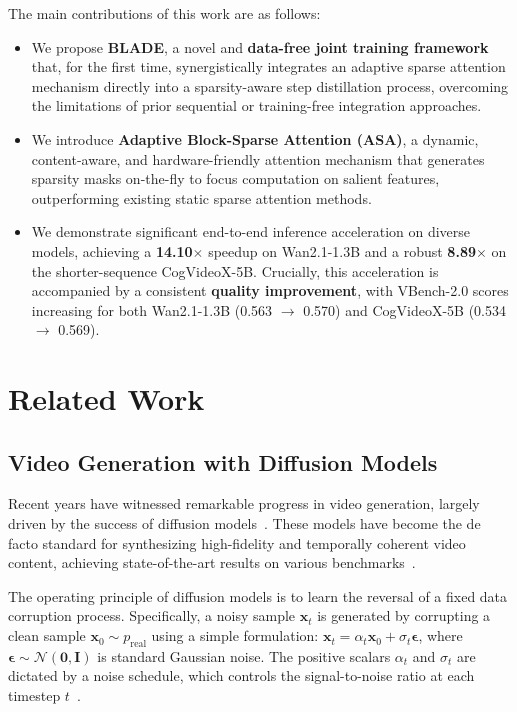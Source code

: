 \documentclass[letterpaper]{article} %
\begin{document}
The main contributions of this work are as follows:
\begin{itemize}
\item We propose \textbf{BLADE}, a novel and \textbf{data-free joint training framework} that, for the first time, synergistically integrates an adaptive sparse attention mechanism directly into a sparsity-aware step distillation process, overcoming the limitations of prior sequential or training-free integration approaches.
\item We introduce \textbf{Adaptive Block-Sparse Attention (ASA)}, a dynamic, content-aware, and hardware-friendly attention mechanism that generates sparsity masks on-the-fly to focus computation on salient features, outperforming existing static sparse attention methods.
\item We demonstrate significant end-to-end inference acceleration on diverse models, achieving a \textbf{14.10$\times$} speedup on Wan2.1-1.3B and a robust \textbf{8.89$\times$} on the shorter-sequence CogVideoX-5B. Crucially, this acceleration is accompanied by a consistent \textbf{quality improvement}, with VBench-2.0 scores increasing for both Wan2.1-1.3B (0.563 $\to$ 0.570) and CogVideoX-5B (0.534 $\to$ 0.569).
\end{itemize}

\section{Related Work}
\label{sec:related_work}

\subsection{Video Generation with Diffusion Models}
Recent years have witnessed remarkable progress in video generation, largely driven by the success of diffusion models~\cite{ho2020denoisingdiffusionprobabilisticmodels,song2021scorebasedgenerativemodelingstochastic,ma2025lattelatentdiffusiontransformer,cao2024controllablegenerationtexttoimagediffusion,he2023latentvideodiffusionmodels}. These models have become the de facto standard for synthesizing high-fidelity and temporally coherent video content, achieving state-of-the-art results on various benchmarks~\cite{huang2023vbench, zheng2025vbench2}.

The operating principle of diffusion models is to learn the reversal of a fixed data corruption process. Specifically, a noisy sample $\mathbf{x}_t$ is generated by corrupting a clean sample $\mathbf{x}_0 \sim p_{\text{real}}$ using a simple formulation: $\mathbf{x}_t = \alpha_t \mathbf{x}_0 + \sigma_t \boldsymbol{\epsilon}$, where $\boldsymbol{\epsilon} \sim \mathcal{N}(\mathbf{0}, \mathbf{I})$ is standard Gaussian noise. The positive scalars $\alpha_t$ and $\sigma_t$ are dictated by a noise schedule, which controls the signal-to-noise ratio at each timestep $t$~\cite{karras2022elucidatingdesignspacediffusionbased}.
\end{document}
